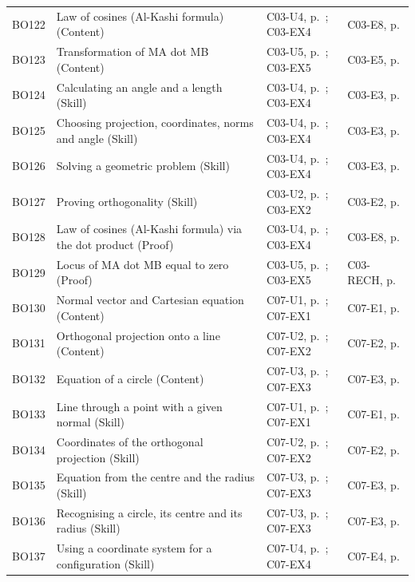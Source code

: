 \begin{longtable}{p{.1\linewidth}p{.43\linewidth}p{.19\linewidth}p{.16\linewidth}}
BO122 & Law of cosines (Al-Kashi formula) (Content) & C03-U4, p.\,\pageref{C03-U4} ; C03-EX4 & C03-E8, p.\,\pageref{C03-E8} \\
BO123 & Transformation of MA dot MB (Content) & C03-U5, p.\,\pageref{C03-U5} ; C03-EX5 & C03-E5, p.\,\pageref{C03-E5} \\
BO124 & Calculating an angle and a length (Skill) & C03-U4, p.\,\pageref{C03-U4} ; C03-EX4 & C03-E3, p.\,\pageref{C03-E3} \\
BO125 & Choosing projection, coordinates, norms and angle (Skill) & C03-U4, p.\,\pageref{C03-U4} ; C03-EX4 & C03-E3, p.\,\pageref{C03-E3} \\
BO126 & Solving a geometric problem (Skill) & C03-U4, p.\,\pageref{C03-U4} ; C03-EX4 & C03-E3, p.\,\pageref{C03-E3} \\
BO127 & Proving orthogonality (Skill) & C03-U2, p.\,\pageref{C03-U2} ; C03-EX2 & C03-E2, p.\,\pageref{C03-E2} \\
BO128 & Law of cosines (Al-Kashi formula) via the dot product (Proof) & C03-U4, p.\,\pageref{C03-U4} ; C03-EX4 & C03-E8, p.\,\pageref{C03-E8} \\
BO129 & Locus of MA dot MB equal to zero (Proof) & C03-U5, p.\,\pageref{C03-U5} ; C03-EX5 & C03-RECH, p.\,\pageref{C03-RECH} \\
BO130 & Normal vector and Cartesian equation (Content) & C07-U1, p.\,\pageref{C07-U1} ; C07-EX1 & C07-E1, p.\,\pageref{C07-E1} \\
BO131 & Orthogonal projection onto a line (Content) & C07-U2, p.\,\pageref{C07-U2} ; C07-EX2 & C07-E2, p.\,\pageref{C07-E2} \\
BO132 & Equation of a circle (Content) & C07-U3, p.\,\pageref{C07-U3} ; C07-EX3 & C07-E3, p.\,\pageref{C07-E3} \\
BO133 & Line through a point with a given normal (Skill) & C07-U1, p.\,\pageref{C07-U1} ; C07-EX1 & C07-E1, p.\,\pageref{C07-E1} \\
BO134 & Coordinates of the orthogonal projection (Skill) & C07-U2, p.\,\pageref{C07-U2} ; C07-EX2 & C07-E2, p.\,\pageref{C07-E2} \\
BO135 & Equation from the centre and the radius (Skill) & C07-U3, p.\,\pageref{C07-U3} ; C07-EX3 & C07-E3, p.\,\pageref{C07-E3} \\
BO136 & Recognising a circle, its centre and its radius (Skill) & C07-U3, p.\,\pageref{C07-U3} ; C07-EX3 & C07-E3, p.\,\pageref{C07-E3} \\
BO137 & Using a coordinate system for a configuration (Skill) & C07-U4, p.\,\pageref{C07-U4} ; C07-EX4 & C07-E4, p.\,\pageref{C07-E4} \\

\end{longtable}
